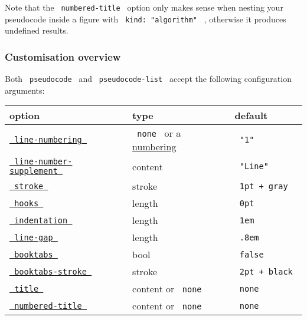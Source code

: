 \pandocbounded{}

Note that the \texttt{\ numbered-title\ } option only makes sense when
nesting your pseudocode inside a figure with
\texttt{\ kind:\ "algorithm"\ } , otherwise it produces undefined
results.

\subsubsection{Customisation overview}\label{customisation-overview}

Both \texttt{\ pseudocode\ } and \texttt{\ pseudocode-list\ } accept the
following configuration arguments:

\begin{longtable}[]{@{}lll@{}}
\toprule\noalign{}
\textbf{option} & \textbf{type} & \textbf{default} \\
\midrule\noalign{}
\endhead
\bottomrule\noalign{}
\endlastfoot
\href{https://github.com/typst/packages/raw/main/packages/preview/lovelace/0.3.0/\#line-numbers}{\texttt{\ line-numbering\ }}
& \texttt{\ none\ } or a
\href{https://typst.app/docs/reference/model/numbering/\#parameters-numbering}{numbering}
& \texttt{\ "1"\ } \\
\href{https://github.com/typst/packages/raw/main/packages/preview/lovelace/0.3.0/\#more-line-number-customisation}{\texttt{\ line-number-supplement\ }}
& content & \texttt{\ "Line"\ } \\
\href{https://github.com/typst/packages/raw/main/packages/preview/lovelace/0.3.0/\#indentation-guides}{\texttt{\ stroke\ }}
& stroke & \texttt{\ 1pt\ +\ gray\ } \\
\href{https://github.com/typst/packages/raw/main/packages/preview/lovelace/0.3.0/\#end-blocks-with-hooks}{\texttt{\ hooks\ }}
& length & \texttt{\ 0pt\ } \\
\href{https://github.com/typst/packages/raw/main/packages/preview/lovelace/0.3.0/\#spacing}{\texttt{\ indentation\ }}
& length & \texttt{\ 1em\ } \\
\href{https://github.com/typst/packages/raw/main/packages/preview/lovelace/0.3.0/\#spacing}{\texttt{\ line-gap\ }}
& length & \texttt{\ .8em\ } \\
\href{https://github.com/typst/packages/raw/main/packages/preview/lovelace/0.3.0/\#booktabs}{\texttt{\ booktabs\ }}
& bool & \texttt{\ false\ } \\
\href{https://github.com/typst/packages/raw/main/packages/preview/lovelace/0.3.0/\#booktabs}{\texttt{\ booktabs-stroke\ }}
& stroke & \texttt{\ 2pt\ +\ black\ } \\
\href{https://github.com/typst/packages/raw/main/packages/preview/lovelace/0.3.0/\#title}{\texttt{\ title\ }}
& content or \texttt{\ none\ } & \texttt{\ none\ } \\
\href{https://github.com/typst/packages/raw/main/packages/preview/lovelace/0.3.0/\#algorithm-as-figure}{\texttt{\ numbered-title\ }}
& content or \texttt{\ none\ } & \texttt{\ none\ } \\
\end{longtable}

